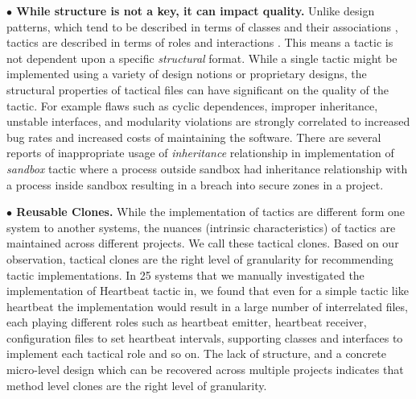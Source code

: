 \documentclass[conference]{IEEEtran}
\begin{document}
\noindent \textbf{$\bullet$ While structure is not a key, it can impact quality.}
Unlike design patterns, which tend to be described in terms of classes and their associations , tactics are described in terms of roles and interactions \cite{bass:arch12}.  This means a tactic is not dependent upon a specific {\em structural} format. While a single tactic might be implemented using a variety of design notions or proprietary designs, the structural properties of tactical files can have significant on the quality of the tactic. For example flaws such as cyclic dependences, improper inheritance, unstable interfaces, and modularity violations are strongly correlated to increased bug rates and increased costs of maintaining the software. There are several reports of inappropriate usage of \emph{inheritance} relationship in implementation of \emph{sandbox} tactic where a process outside sandbox had inheritance relationship with a process inside sandbox resulting in a breach into secure zones in a project.

\noindent \textbf{$\bullet$ Reusable Clones.}
While the implementation of tactics are different form one system to another systems, the nuances (intrinsic characteristics) of tactics are maintained across different projects. We call these tactical clones. Based on our observation, tactical clones are the right level of granularity for recommending tactic implementations.
In 25 systems that we manually investigated the implementation of Heartbeat tactic in, we found that even for a simple tactic like heartbeat the implementation would result in a large number of interrelated files, each playing different roles such as heartbeat emitter, heartbeat receiver, configuration files to set heartbeat intervals, supporting classes and interfaces to implement each  tactical role and so on. The lack of structure, and a concrete micro-level design which can be recovered across multiple projects indicates that method level clones are the right level of granularity.
\end{document}

